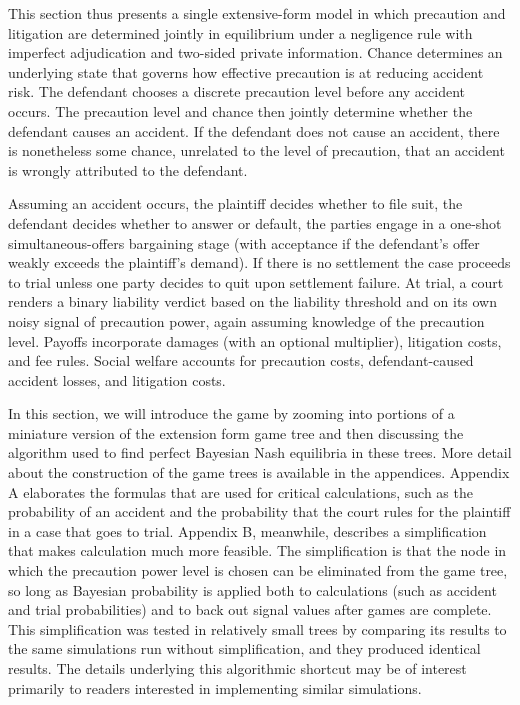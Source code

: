 \documentclass{article}
\begin{document}
This section thus presents a single extensive-form model in which precaution and litigation are determined jointly in equilibrium under a negligence rule with imperfect adjudication and two-sided private information. Chance determines an underlying state that governs how effective precaution is at reducing accident risk. The defendant chooses a discrete precaution level before any accident occurs. The precaution level and chance then jointly determine whether the defendant causes an accident. If the defendant does not cause an accident, there is nonetheless some chance, unrelated to the level of precaution, that an accident is wrongly attributed to the defendant. 

Assuming an accident occurs, the plaintiff decides whether to file suit, the defendant decides whether to answer or default, the parties engage in a one-shot simultaneous-offers bargaining stage (with acceptance if the defendant’s offer weakly exceeds the plaintiff’s demand). If there is no settlement the case proceeds to trial unless one party decides to quit upon settlement failure. At trial, a court renders a binary liability verdict based on the liability threshold and on its own noisy signal of precaution power, again assuming knowledge of the precaution level. Payoffs incorporate damages (with an optional multiplier), litigation costs, and fee rules. Social welfare accounts for precaution costs, defendant-caused accident losses, and litigation costs. 

In this section, we will introduce the game by zooming into portions of a miniature version of the extension form game tree and then discussing the algorithm used to find perfect Bayesian Nash equilibria in these trees. More detail about the construction of the game trees is available in the appendices. Appendix A elaborates the formulas that are used for critical calculations, such as the probability of an accident and the probability that the court rules for the plaintiff in a case that goes to trial. Appendix B, meanwhile, describes a simplification that makes calculation much more feasible. The simplification is that the node in which the precaution power level is chosen can be eliminated from the game tree, so long as Bayesian probability is applied both to calculations (such as accident and trial probabilities) and to back out signal values after games are complete. This simplification was tested in relatively small trees by comparing its results to the same simulations run without simplification, and they produced identical results. The details underlying this algorithmic shortcut may be of interest primarily to readers interested in implementing similar simulations.
\end{document}
